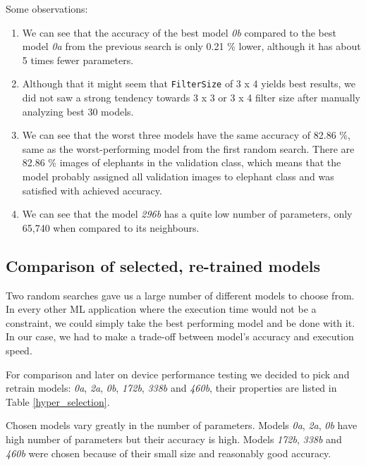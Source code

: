 \clearpage
Some observations:
\begin{enumerate}
    \item We can see that the accuracy of the best model \textit{0b} compared to the best model \textit{0a} from the previous search is only 0.21 \% lower, although it has about 5 times fewer parameters.
    \item Although that it might seem that \verb|FilterSize| of 3 x 4 yields best results, we did not saw a strong tendency towards 3 x 3 or 3 x 4 filter size after manually analyzing best 30 models.
    \item We can see that the worst three models have the same accuracy of 82.86 \%, same as the worst-performing model from the first random search. There are 82.86 \% images of elephants in the validation class, which means that the model probably assigned all validation images to elephant class and was satisfied with achieved accuracy.
    \item We can see that the model \textit{296b} has a quite low number of parameters, only 65,740 when compared to its neighbours.
\end{enumerate}

\subsection{ Comparison of selected, re-trained models}
    
Two random searches gave us a large number of different models to choose from.
In every other ML application where the execution time would not be a constraint, we could simply take the best performing model and be done with it.
In our case, we had to make a trade-off between model's accuracy and execution speed.

For comparison and later on device performance testing we decided to pick and retrain models: \textit{0a}, \textit{2a}, \textit{0b}, \textit{172b}, \textit{338b} and \textit{460b}, their properties are listed in Table \ref{hyper_selection}.

Chosen models vary greatly in the number of parameters.
Models \textit{0a}, \textit{2a}, \textit{0b} have high number of parameters but their accuracy is high.
Models \textit{172b}, \textit{338b} and \textit{460b} were chosen because of their small size and reasonably good accuracy.


